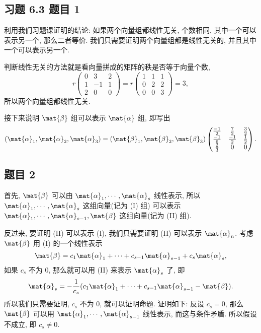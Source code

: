 \subsection*{ 习题 6.3 题目 1 }
\begin{solution}
利用我们习题课证明的结论: 如果两个向量组都线性无关, 个数相同, 其中一个可以表示另一个, 那么二者等价. 我们只需要证明两个向量组都是线性无关的, 并且其中一个可以表示另一个.

判断线性无关的方法就是看向量拼成的矩阵的秩是否等于向量个数, 
\[
r\left(\begin{matrix}
    0 & 3 & 2 \\
    1 & -1 & 1 \\
    2 & 0 & 0
    \end{matrix}\right)
    = r \left(\begin{matrix}
        1 & 1 & 1 \\
        0 & 2 & 2 \\
        0 & 0 & 3
        \end{matrix}\right) = 3,
\]
所以两个向量组都线性无关.

接下来说明 $\mat{\beta}$ 组可以表示 $\mat{\alpha}$ 组, 即写出
\[
(\mat{\alpha}_1, \mat{\alpha}_2, \mat{\alpha}_3) = (\mat{\beta}_1, \mat{\beta}_2, \mat{\beta}_3)\left(\begin{matrix}
    \frac{-1}{2} & \frac{7}{2} & \frac{3}{2} \\
    \frac{-1}{6} & \frac{-1}{2} & \frac{1}{2} \\
    \frac{2}{3} & 0 & 0
    \end{matrix}\right).
\]
\end{solution}

\subsection*{ 题目 2 }
\begin{solution}
首先, $\mat{\beta}$ 可以由 $\mat{\alpha}_1, \cdots, \mat{\alpha}_{s}$ 线性表示, 所以 $\mat{\alpha}_1, \cdots, \mat{\alpha}_{s}$ 这组向量(记为 (I) 组) 可以表示 $\mat{\alpha}_1, \cdots, \mat{\alpha}_{s - 1}, \mat{\beta}$ 这组向量(记为 (I\!I) 组). 

反过来, 要证明 (I\!I) 可以表示 (I), 我们只需要证明 (I\!I) 可以表示 $\mat{\alpha}_n$. 考虑 $\mat{\beta}$ 用 (I) 的一个线性表示
\[
\mat{\beta} = c_1 \mat{\alpha}_1 + \cdots + c_{s - 1} \mat{\alpha}_{s - 1} + c_{s} \mat{\alpha}_{s},
\]
如果 $c_s$ 不为 $0$, 那么就可以用 (I\!I) 来表示 $\mat{\alpha}_{s}$ 了, 即
\[
    \mat{\alpha}_{s} = -\frac{1}{c_s}(c_1 \mat{\alpha}_1 + \cdots + c_{s - 1} \mat{\alpha}_{s - 1} - \mat{\beta}).
\]
 所以我们只需要证明, $c_s$ 不为 $0$, 就可以证明命题. 证明如下: 反设 $c_s = 0$, 那么 $\mat{\beta}$ 可以用  $\mat{\alpha}_1, \cdots, \mat{\alpha}_{s - 1}$ 线性表示, 而这与条件矛盾. 所以假设不成立, 即 $c_s \not= 0$. 
\end{solution}

